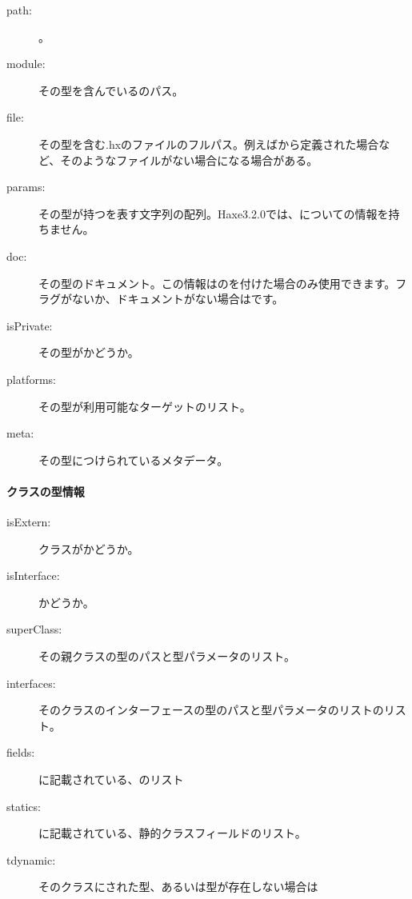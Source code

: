 \begin{description}
	\item[path:] 。
	\item[module:] その型を含んでいるのパス。
	\item[file:] その型を含む.hxのファイルのフルパス。例えばから定義された場合など、そのようなファイルがない場合になる場合がある。
	\item[params:] その型が持つを表す文字列の配列。Haxe3.2.0では、についての情報を持ちません。
	\item[doc:] その型のドキュメント。この情報はのを付けた場合のみ使用できます。フラグがないか、ドキュメントがない場合はです。
	\item[isPrivate:] その型がかどうか。
	\item[platforms:] その型が利用可能なターゲットのリスト。
	\item[meta:] その型につけられているメタデータ。
\end{description}
	
\paragraph{クラスの型情報}
\label{cr-rtti-class-type-information}

\begin{description}
	\item[isExtern:] クラスがかどうか。
	\item[isInterface:] かどうか。
	\item[superClass:] その親クラスの型のパスと型パラメータのリスト。
	\item[interfaces:] そのクラスのインターフェースの型のパスと型パラメータのリストのリスト。
	\item[fields:] に記載されている、のリスト
	\item[statics:] に記載されている、静的クラスフィールドのリスト。
	\item[tdynamic:] そのクラスにされた型、あるいは型が存在しない場合は
\end{description}

